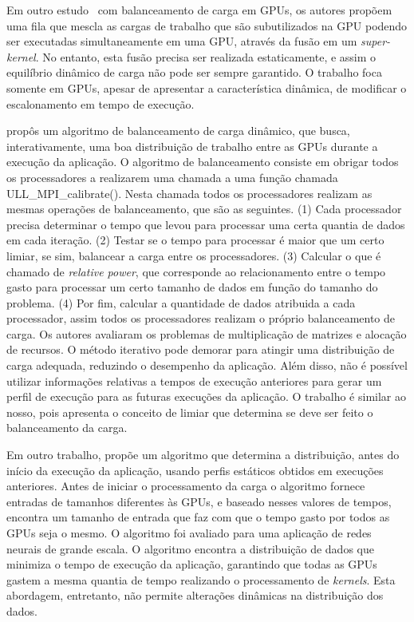 Em outro estudo~\citep{tasks} com balanceamento de carga em GPUs, os autores propõem uma fila que mescla as cargas de trabalho que são subutilizados na GPU podendo ser executadas simultaneamente em uma GPU, através da fusão em um \textit{super-kernel}. No entanto, esta fusão precisa ser realizada estaticamente, e assim o equilíbrio dinâmico de carga não pode ser sempre garantido. O trabalho foca somente em GPUs, apesar de apresentar a característica dinâmica, de modificar o escalonamento em tempo de execução.

\citep{acosta} propôs um algoritmo de balanceamento de carga
dinâmico, que busca, interativamente, uma boa distribuição de trabalho entre as
GPUs durante a execução da aplicação. O algoritmo de balanceamento consiste em obrigar todos os processadores a realizarem uma chamada a uma função chamada ULL\_MPI\_calibrate(). Nesta chamada todos os processadores realizam as mesmas operações de balanceamento, que são as seguintes. (1) Cada processador precisa determinar o tempo que levou para processar uma certa quantia de dados em cada iteração. (2) Testar se o tempo para processar é maior que um certo limiar, se sim, balancear a carga entre os processadores. (3) Calcular o que é chamado de \emph{relative power}, que corresponde ao relacionamento entre o tempo gasto para processar um certo tamanho de dados em função do tamanho do problema. (4) Por fim, calcular a quantidade de dados atribuida a cada processador, assim todos os processadores realizam o próprio balanceamento de carga. Os autores avaliaram os problemas de
multiplicação de matrizes e alocação de recursos. O método iterativo pode
demorar para atingir uma distribuição de carga adequada, reduzindo o desempenho
da aplicação. Além disso, não é possível utilizar informações relativas a tempos
de execução anteriores para gerar um perfil de execução para as futuras
execuções da aplicação. O trabalho é similar ao nosso, pois apresenta o conceito de limiar que determina se deve ser feito o balanceamento da carga.

Em outro trabalho, \citep{raphael} propõe um algoritmo que determina a
distribuição, antes do início da execução da aplicação, usando perfis estáticos
obtidos em execuções anteriores. Antes de iniciar o processamento da carga o algoritmo fornece entradas de tamanhos diferentes às GPUs, e baseado nesses valores de tempos, encontra um tamanho de entrada que faz com que o tempo gasto por todos as GPUs seja o mesmo.
O algoritmo foi avaliado para uma aplicação de
redes neurais de grande escala. O algoritmo encontra a distribuição de dados que
minimiza o tempo de execução da aplicação, garantindo que todas as GPUs gastem a
mesma quantia de tempo realizando o processamento de \emph{kernels}. Esta
abordagem, entretanto, não permite alterações dinâmicas na distribuição dos
dados. 


